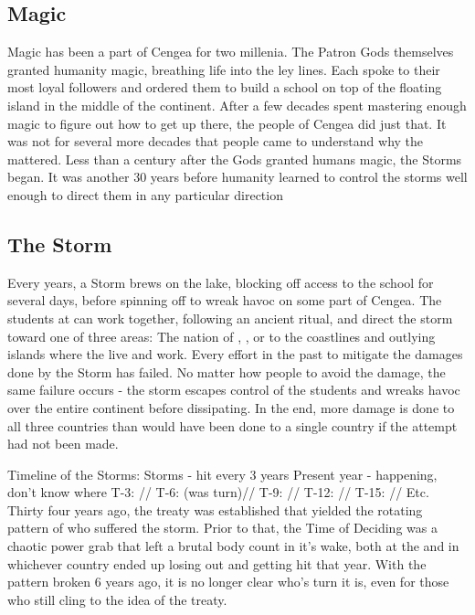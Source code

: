 \documentclass[blue]{GL2020}
\begin{document}
\subsection*{Magic}
Magic has been a part of Cengea for two millenia. The Patron Gods themselves granted humanity magic, breathing life into the ley lines. Each spoke to their most loyal followers and ordered them to build a school on top of the floating island in the middle of the continent. After a few decades spent mastering enough magic to figure out how to get up there, the people of Cengea did just that. It was not for several more decades that people came to understand why the \pSc{} mattered. Less than a century after the Gods granted humans magic, the Storms began. It was another 30 years before humanity learned to control the storms well enough to direct them in any particular direction

\subsection*{The Storm}
Every \pCycle{} years, a Storm brews on the lake, blocking off access to the school for several days, before spinning off to wreak havoc on some part of Cengea. The students at \pSchool{} can work together, following an ancient ritual, and direct the storm toward one of three areas: The nation of \pFarm{}, \pTech{}, or to the coastlines and outlying islands where the \pShippies{} live and work. Every effort in the past to mitigate the damages done by the Storm has failed. No matter how people to avoid the damage, the same failure occurs - the storm escapes control of the students and wreaks havoc over the entire continent before dissipating. In the end, more damage is done to all three countries than would have been done to a single country if the attempt had not been made. 

Timeline of the Storms:
Storms - hit every 3 years
Present year - happening, don’t know where
T-3: \pShip{}//
T-6: \pShip{} (was \pTech{} turn)//
T-9: \pFarm{}//
T-12: \pShip{}//
T-15: \pTech{}//
Etc.
Thirty four years ago, the treaty was established that yielded the rotating pattern of who suffered the storm. Prior to that, the Time of Deciding was a chaotic power grab that left a brutal body count in it's wake, both at the \pSchool{} and in whichever country ended up losing out and getting hit that year. With the pattern broken 6 years ago, it is no longer clear who's turn it is, even for those who still cling to the idea of the treaty.
\end{document}
